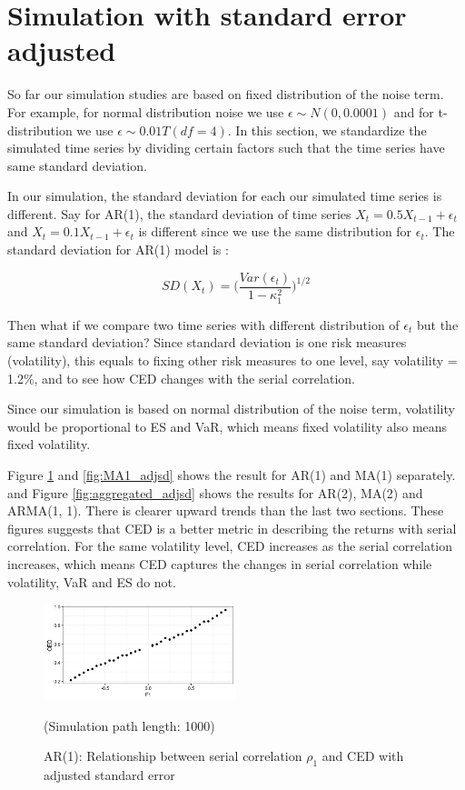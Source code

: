 \documentclass[11pt]{article}
\begin{document}
\section{Simulation with standard error adjusted} %

So far our simulation studies are based on fixed distribution of the noise term. For example, for normal distribution noise we use $\epsilon \sim N(0, 0.0001)$ and for t-distribution we use $\epsilon \sim 0.01T(df =4)$. In this section, we standardize the simulated time series by dividing certain factors such that the time series have same standard deviation. 

In our simulation, the standard deviation for each our simulated time series is different. Say for AR(1), the standard deviation of time series $X_t = 0.5  X_{t-1} + \epsilon_t$ and $X_t = 0.1  X_{t-1} + \epsilon_t$ is different since we use the same distribution for $\epsilon_t$. The standard deviation for AR(1) model is :

\begin{equation}
SD(X_t) = \Big(\frac{Var(\epsilon_t)}{1-\kappa_1^2}\Big)^{1/2}
\end{equation}

 Then what if we compare two time series with different distribution of $\epsilon_t$ but the same standard deviation? Since standard deviation is one risk measures (volatility), this equals to fixing other risk measures to one level, say volatility = 1.2\%, and to see how CED changes with the serial correlation. 

 Since our simulation is based on normal distribution of the noise term, volatility would be proportional to ES and VaR, which means fixed volatility also means fixed volatility. 

 Figure \ref{fig:AR1_adjsd} and \ref{fig:MA1_adjsd} shows the result for AR(1) and MA(1) separately. and Figure \ref{fig:aggregated_adjsd} shows the results for AR(2), MA(2) and ARMA(1, 1). There is clearer upward trends than the last two sections. These figures suggests that CED is a better metric in describing the returns with serial correlation. For the same volatility level, CED increases as the serial correlation increases, which means CED captures the changes in serial correlation while volatility, VaR and ES do not. 

\begin{figure}[H]
\centering
\includegraphics[width = 0.5\textwidth]{../figures/simulation/AR1_adjsd}
\caption{AR(1): Relationship between serial correlation $\rho_1$ and CED with adjusted standard error}
(Simulation path length: 1000)
\label{fig:AR1_adjsd}
\end{figure}
\end{document}
